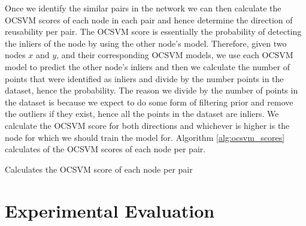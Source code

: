 \documentclass{mpaper}
\begin{document}
Once we identify the similar pairs in the network we can then calculate the OCSVM scores of each node in each pair and hence determine the direction of reusability per pair. The OCSVM score is essentially the probability of detecting the inliers of the node by using the other node's model.  Therefore, given two nodes $x$ and $y$, and their corresponding OCSVM models, we use each OCSVM model to predict the other node's inliers and then we calculate the number of points that were identified as inliers and divide by the number points in the dataset, hence the probability. The reason we divide by the number of points in the dataset is because we expect to do some form of filtering prior and remove the outliers if they exist, hence all the points in the dataset are inliers. We calculate the OCSVM score for both directions and whichever is higher is the node for which we should train the model for. Algorithm \ref{alg:ocsvm_scores} calculates of the OCSVM scores of each node per pair.

\begin{algorithm}
    \DontPrintSemicolon
    \caption{Calculates the OCSVM score of each node per pair
    }\label{alg:ocsvm_scores}
    
    
\end{algorithm}

\section{Experimental Evaluation}
\end{document}
